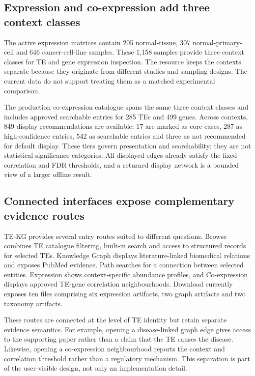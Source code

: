 \subsection{Expression and co-expression add three context classes}

The active expression matrices contain 205 normal-tissue, 307 normal-primary-cell and 646 cancer-cell-line samples. These 1,158 samples provide three context classes for TE and gene expression inspection. The resource keeps the contexts separate because they originate from different studies and sampling designs. The current data do not support treating them as a matched experimental comparison.

The production co-expression catalogue spans the same three context classes and includes approved searchable entries for 285 TEs and 499 genes. Across contexts, 849 display recommendations are available: 17 are marked as core cases, 287 as high-confidence entries, 542 as searchable entries and three as not recommended for default display. These tiers govern presentation and searchability; they are not statistical significance categories. All displayed edges already satisfy the fixed correlation and FDR thresholds, and a returned display network is a bounded view of a larger offline result.

\subsection{Connected interfaces expose complementary evidence routes}

TE-KG provides several entry routes suited to different questions. Browse combines TE catalogue filtering, built-in search and access to structured records for selected TEs. Knowledge Graph displays literature-linked biomedical relations and exposes PubMed evidence. Path searches for a connection between selected entities. Expression shows context-specific abundance profiles, and Co-expression displays approved TE-gene correlation neighbourhoods. Download currently exposes ten files comprising six expression artifacts, two graph artifacts and two taxonomy artifacts.

These routes are connected at the level of TE identity but retain separate evidence semantics. For example, opening a disease-linked graph edge gives access to the supporting paper rather than a claim that the TE causes the disease. Likewise, opening a co-expression neighbourhood reports the context and correlation threshold rather than a regulatory mechanism. This separation is part of the user-visible design, not only an implementation detail.

